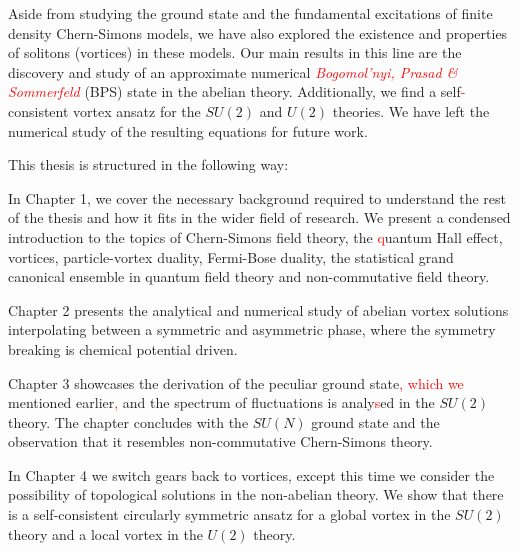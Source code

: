     Aside from studying the ground state and the fundamental excitations of finite density Chern-Simons models, we have also explored the existence and properties of solitons (vortices) in these models. Our main results in this line are the discovery and study of an approximate numerical \textcolor{red}{\textit{Bogomol'nyi, Prasad \& Sommerfeld}} (BPS) state in the abelian theory. Additionally, we find a self\textcolor{red}{-}consistent vortex ansatz for the $SU(2)$ and $U(2)$ theories. We have left the numerical study of the resulting equations for future work.

    This thesis is structured in the following way:

    In Chapter 1, we cover the necessary background required to understand the rest of the thesis and how it fits in the wider field of research. We present a condensed introduction to the topics of Chern-Simons field theory, the \textcolor{red}{q}uantum Hall effect, vortices, particle-vortex duality, Fermi-Bose duality, the statistical grand canonical ensemble in quantum field theory and non-commutative field theory.

    Chapter 2 presents the analytical and numerical study of abelian vortex solutions interpolating between a symmetric and asymmetric phase, where the symmetry breaking is chemical potential driven.

    Chapter 3 showcases the derivation of the peculiar ground state\textcolor{red}{, which we} mentioned earlier\textcolor{red}{,} and the spectrum of fluctuations is analy\textcolor{red}{s}ed in the $SU(2)$ theory. The chapter concludes with the $SU(N)$ ground state and the observation that it resembles non-commutative Chern-Simons theory.

    In Chapter 4 we switch gears back to vortices, except this time we consider the possibility of topological solutions in the non-abelian theory. We show that there is a self-consistent circularly symmetric ansatz for a global vortex in the $SU(2)$ theory and a local vortex in the $U(2)$ theory.



